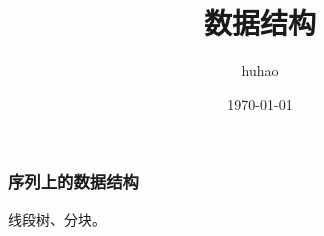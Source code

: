\documentclass[10pt]{beamer}
\begin{document}
	\title{数据结构}
	\date{\today}
	\author{huhao}
	\maketitle
	\clearpage
	\begin{frame}
		\frametitle{序列上的数据结构}
	
		线段树、分块。
	
	\end{frame}
\end{document}
